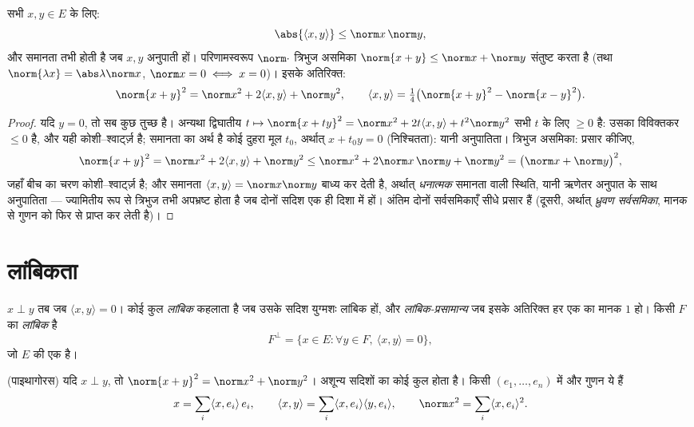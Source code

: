 \begin{theorem}[कोशी--श्वार्ट्ज़; मानक के गुण]\label{thm:b1:euclid:cs}
सभी $x, y \in E$ के लिए:
\[
\abs{\langle x, y\rangle} \leq \norm x\, \norm y ,
\]
और समानता तभी होती है जब $x, y$ अनुपाती हों। परिणामस्वरूप $\norm\cdot$
त्रिभुज असमिका $\norm{x + y} \leq \norm x + \norm y$ संतुष्ट करता है (तथा
$\norm{\lambda x} = \abs\lambda \norm x$, $\norm x = 0 \iff x = 0$)। इसके
अतिरिक्त:
\[
\norm{x+y}^2 = \norm x^2 + 2\langle x, y\rangle + \norm y^2,
\qquad
\langle x, y \rangle = \tfrac14\bigl(\norm{x+y}^2 -
\norm{x-y}^2\bigr) .
\]
\end{theorem}

\begin{proof}
यदि $y = 0$, तो सब कुछ तुच्छ है। अन्यथा द्विघातीय $t \mapsto \norm{x + ty}^2
= \norm x^2 + 2t\langle x, y\rangle + t^2 \norm y^2$ सभी $t$ के लिए $\geq 0$
है: उसका विविक्तकर $\leq 0$ है, और यही कोशी--श्वार्ट्ज़ है; समानता का अर्थ
है कोई दुहरा मूल $t_0$, अर्थात् $x + t_0 y = 0$ (निश्चितता): यानी अनुपातिता।
त्रिभुज असमिका: प्रसार कीजिए,
\[
\norm{x + y}^2 = \norm x^2 + 2\langle x, y\rangle + \norm y^2
\leq \norm x^2 + 2\norm x\,\norm y + \norm y^2
= \bigl(\norm x + \norm y\bigr)^2 ,
\]
जहाँ बीच का चरण कोशी--श्वार्ट्ज़ है; और समानता $\langle x, y\rangle = \norm
x\norm y$ बाध्य कर देती है, अर्थात् \emph{धनात्मक} समानता वाली स्थिति, यानी
ऋणेतर अनुपात के साथ अनुपातिता --- ज्यामितीय रूप से त्रिभुज तभी अपभ्रष्ट होता
है जब दोनों सदिश एक ही दिशा में हों। अंतिम दोनों सर्वसमिकाएँ सीधे प्रसार हैं
(दूसरी, अर्थात् \emph{ध्रुवण सर्वसमिका}, मानक से गुणन को फिर से प्राप्त कर
लेती है)।
\end{proof}

\section{लांबिकता}

\begin{definition}\label{def:b1:euclid:orthogonal}
$x \perp y$ तब जब $\langle x, y \rangle = 0$। कोई कुल \emph{लांबिक} कहलाता
है जब उसके सदिश युग्मशः लांबिक हों, और
\emph{लांबिक-प्रसामान्य} जब इसके अतिरिक्त हर एक
का मानक $1$ हो। किसी  $F$ का \emph{लांबिक } है
\[
F^{\perp} = \{x \in E : \forall y \in F,\ \langle x, y\rangle =
0\},
\]
जो $E$ की एक  है।
\end{definition}

\begin{proposition}\label{prop:b1:euclid:orthfree}
(पाइथागोरस) यदि $x \perp y$, तो $\norm{x+y}^2 =
\norm x^2 + \norm y^2$। अशून्य सदिशों का कोई  कुल  होता है।
किसी   $(e_1, \dots, e_n)$ में  और गुणन ये
हैं
\[
x = \sum_{i} \langle x, e_i\rangle\, e_i,
\qquad
\langle x, y \rangle = \sum_i \langle x, e_i\rangle \langle y,
e_i\rangle,
\qquad
\norm x^2 = \sum_i \langle x, e_i\rangle^2 .
\]
\end{proposition}

